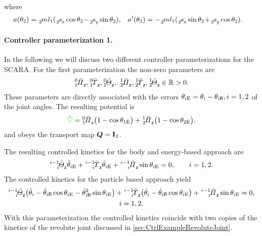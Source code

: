 where
\begin{align}
 a(\jointAngle[2]) &= \bodyMass{}{2} l_1 (\bodyCOMCoeff{}{2}{\idxX} \cos\jointAngle[2] \!-\! \bodyCOMCoeff{}{2}{\idxY} \sin\jointAngle[2]),&
 a'(\jointAngle[2]) &= -\bodyMass{}{2} l_1 (\bodyCOMCoeff{}{2}{\idxX} \sin\jointAngle[2] \!+\! \bodyCOMCoeff{}{2}{\idxY} \cos\jointAngle[2]).
\end{align}

\paragraph{Controller parameterization 1.}
In the following we will discuss two different controller parameterizations for the SCARA.
For the first parameterization the non-zero parameters are
\begin{align}
 \bodyMOSCoeffC{0}{1}{\idxZ}, 
 \bodyMODCoeffC{0}{1}{\idxZ}, 
 \bodyMOICoeffC{0}{1}{\idxZ}, \
 \bodyMOSCoeffC{1}{2}{\idxZ}, 
 \bodyMODCoeffC{1}{2}{\idxZ},
 \bodyMOICoeffC{1}{2}{\idxZ} \in \RealNum > 0.
\end{align}
These parameters are directly associated with the errors $\jointAngleE[i] = \jointAngle[i] - \jointAngleR[i], i=1,2$ of the joint angles.
The resulting potential is
\begin{align}
 \potentialEnergyC = \bodyMOSCoeffC{0}{1}{\idxZ} \big( 1-\cos \jointAngleE[1] \big) + \bodyMOSCoeffC{1}{2}{\idxZ}\big( 1-\cos\jointAngleE[2] \big).
\end{align}
and obeys the transport map $\sysTransportMap = \idMat[2]$.

The resulting controlled kinetics for the body and energy-based approach are
\begin{align}\label{eq:ScaraClosedLoop11}
 \bodyMOICoeffC{i-1}{i}{\idxZ} \jointAngleEdd[i]
 + \bodyMODCoeffC{i-1}{i}{\idxZ} \jointAngleEd[i]
 + \bodyMOSCoeffC{i-1}{i}{\idxZ} \sin \jointAngleE[i]
 = 0, \qquad i=1,2.
\end{align}
The controlled kinetics for the particle based approach yield
\begin{multline}\label{eq:ScaraClosedLoop12}
 \bodyMOICoeffC{i-1}{i}{\idxZ} \big( \jointAngledd[i] - \jointAngleRdd[i]\cos\jointAngleE[i] - \jointAngleRd[i]^2 \sin\jointAngleE[i] \big)
 + \bodyMODCoeffC{i-1}{i}{\idxZ} \big( \jointAngled[i] - \jointAngleRd[i]\cos\jointAngleE[i] \big)
 + \bodyMOSCoeffC{i-1}{i}{\idxZ} \sin \jointAngleE[i]
 = 0,
\\
 i=1,2.
\end{multline}
With this parameterization the controlled kinetics coincide with two copies of the kinetics of the revolute joint discussed in \autoref{sec:CtrlExampleRevoluteJoint}.


